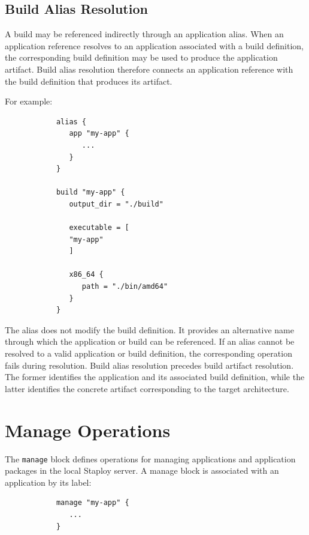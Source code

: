 \documentclass[11pt,a4paper]{article}
\begin{document}
    \subsection{Build Alias Resolution}\label{subsec:build-alias-resolution}

    A build may be referenced indirectly through an application alias.
    When an application reference resolves to an application associated with a build definition,
    the corresponding build definition may be used to produce the application artifact.
    Build alias resolution therefore connects an application reference with the build definition that produces its artifact.

    For example:

    \begin{center}
        \begin{verbatim}
            alias {
               app "my-app" {
                  ...
               }
            }

            build "my-app" {
               output_dir = "./build"

               executable = [
               "my-app"
               ]

               x86_64 {
                  path = "./bin/amd64"
               }
            }
        \end{verbatim}
    \end{center}

    The alias does not modify the build definition.
    It provides an alternative name through which the application or build can be referenced.
    If an alias cannot be resolved to a valid application or build definition, the corresponding operation fails during resolution.
    Build alias resolution precedes build artifact resolution.
    The former identifies the application and its associated build definition,
    while the latter identifies the concrete artifact corresponding to the target architecture.


    \section{Manage Operations}\label{sec:manage-operations}

    The \texttt{manage} block defines operations for managing applications and application packages in the local Staploy server.
    A manage block is associated with an application by its label:

    \begin{center}
        \begin{verbatim}
            manage "my-app" {
               ...
            }
        \end{verbatim}
    \end{center}
\end{document}
